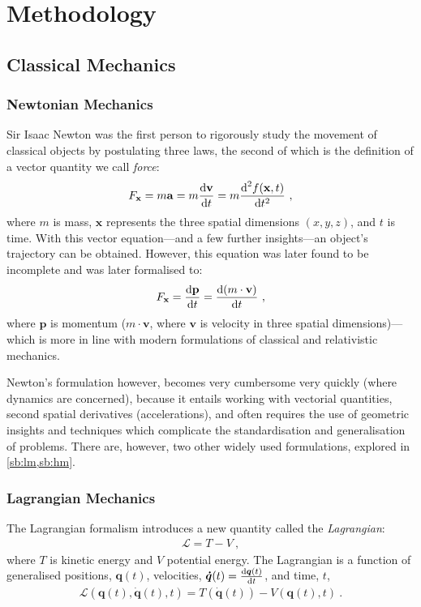 \chapter{Methodology}\label{c:mm}
%
\section{Classical Mechanics}\label{s:cm}
%
\subsection{Newtonian Mechanics}\label{sb:nm}
Sir Isaac Newton was the first person to rigorously study the movement of classical objects by postulating three laws, the second of which is the definition of a vector quantity we call \emph{force}:
\begin{align}\label{eq:n1}
F_{\mathbf{x}} = m \mathbf{a} = m \frac{\textrm{d} \mathbf{v}}{\textrm{d} t} = m \frac{\textrm{d} ^{2}f(\mathbf{x},t)}{\textrm{d} t^{2}}~,
\end{align}
where $ m $ is mass, $ \mathbf{x} $ represents the three spatial dimensions $ (x,y,z) $, and $ t $ is time. With this vector equation---and a few further insights---an object's trajectory can be obtained. However, this equation was later found to be incomplete and was later formalised to:
\begin{align}\label{eq:n2}
F_{\mathbf{x}} = \frac{\textrm{d} \mathbf{p}}{\textrm{d} t} = \frac{\textrm{d} (m \cdot \mathbf{v})}{\textrm{d} t}~,
\end{align}
where $ \mathbf{p} $ is momentum ($ m\cdot\mathbf{v} $, where $ \mathbf{v} $ is velocity in three spatial dimensions)---which is more in line with modern formulations of classical and relativistic mechanics. 

Newton's formulation however, becomes very cumbersome very quickly (where dynamics are concerned), because it entails working with vectorial quantities, second spatial derivatives (accelerations), and often requires the use of geometric insights and techniques which complicate the standardisation and generalisation of problems. There are, however, two other widely used formulations, explored in \cref{sb:lm,sb:hm}.
%
\subsection{Lagrangian Mechanics}\label{sb:lm}
%
The Lagrangian formalism introduces a new quantity called the \emph{Lagrangian}:
\begin{align}\label{eq:lagrangian}
\mathcal{L} = T - V~,
\end{align}
where $ T $ is kinetic energy and $ V $ potential energy. The Lagrangian is a function of generalised positions, $ \bm{q}(t) $, velocities, $ \bm{\dot{q}}(t) = \frac{\textrm{d} \bm{q}(t)}{\textrm{d} t}$, and time, $ t $,
\begin{align}\label{eq:ldep}
\mathcal{L}(\bm{q}(t), \dot{\bm{q}}(t), t) = T(\dot{\bm{q}}(t)) - V(\bm{q}(t),t)~.
\end{align}

